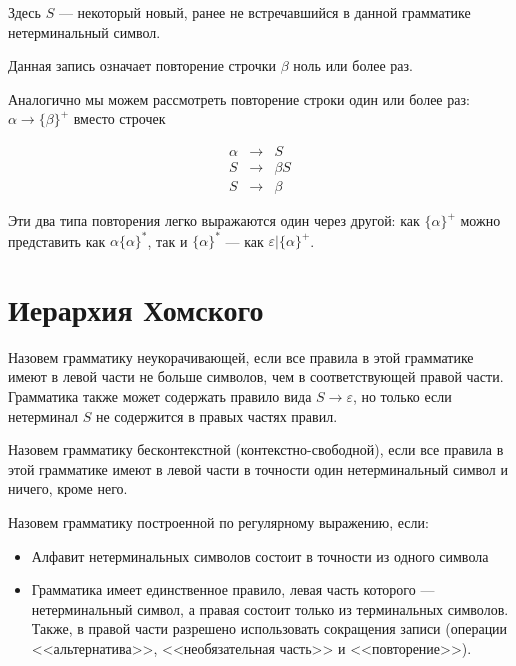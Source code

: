 \documentclass[12pt,a4paper,oneside]{article}
\begin{document}
Здесь $S$ --- некоторый новый, ранее не встречавшийся в данной грамматике нетерминальный
символ. 

Данная запись означает повторение строчки $\beta$ ноль или более раз.

Аналогично мы можем рассмотреть повторение строки один или более раз:
$\alpha \rightarrow \{\beta\}^+$ вместо строчек
\begin{bnf}\begin{eqnarray*}
\alpha &\rightarrow&S\\
S &\rightarrow& \beta S \\
S &\rightarrow& \beta
\end{eqnarray*}\end{bnf}
\vspace{-0.3cm}

Эти два типа повторения легко выражаются один через другой: как $\{\alpha\}^+$ можно
представить как $\alpha\{\alpha\}^*$, так и $\{\alpha\}^*$ --- как $\varepsilon | \{\alpha\}^+$.

\section{Иерархия Хомского}

\begin{definition}
Назовем грамматику неукорачивающей, если все правила в этой
грамматике имеют в левой части не больше символов, чем
в соответствующей правой части.
Грамматика также может содержать правило вида $S \rightarrow \varepsilon$, но только
если нетерминал $S$ не содержится в правых частях правил.
\end{definition}

\begin{definition}
Назовем грамматику бесконтекстной (контекстно-свободной), если все правила в этой
грамматике имеют в левой части в точности один нетерминальный символ и ничего, кроме
него.
\end{definition}

\begin{definition}
Назовем грамматику построенной по регулярному выражению, если:
\begin{itemize}
\item Алфавит нетерминальных символов состоит в точности из одного символа
\item Грамматика имеет единственное правило, левая часть которого --- нетерминальный
символ, а правая состоит только из терминальных символов. Также, в правой части
разрешено использовать сокращения записи (операции <<альтернатива>>, 
<<необязательная часть>> и <<повторение>>).
\end{itemize}
\end{definition}
\end{document}
